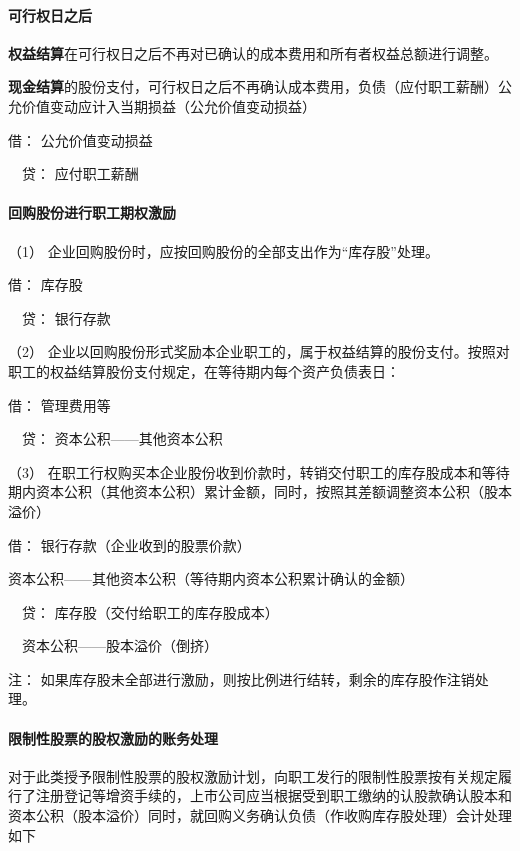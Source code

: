 \documentclass[UTF8,12pt]{ctexart}
\newenvironment{Dr}{\noindent 借：}{\par}
\newenvironment{Cr}{\noindent \ \ 贷：}{\par}
\numberwithin{equation}{section} %
\numberwithin{figure}{section}
\numberwithin{table}{section}
\begin{document}
	\paragraph{可行权日之后}
	\textbf{权益结算}在可行权日之后不再对已确认的成本费用和所有者权益总额进行调整。
	
	\textbf{现金结算}的股份支付，可行权日之后不再确认成本费用，负债（应付职工薪酬）公允价值变动应计入当期损益（公允价值变动损益）

	\begin{Dr}
		公允价值变动损益
	\end{Dr}	
	\begin{Cr}
		应付职工薪酬
	\end{Cr}

	
	\paragraph{回购股份进行职工期权激励}
	（1）	企业回购股份时，应按回购股份的全部支出作为“库存股”处理。
	
	\begin{Dr}
		库存股
	\end{Dr}
	\begin{Cr}
		银行存款
	\end{Cr}

	（2）	企业以回购股份形式奖励本企业职工的，属于权益结算的股份支付。按照对职工的权益结算股份支付规定，在等待期内每个资产负债表日：
	
	\begin{Dr}
		管理费用等
	\end{Dr}
	\begin{Cr}
		资本公积——其他资本公积
	\end{Cr}

	（3）	在职工行权购买本企业股份收到价款时，转销交付职工的库存股成本和等待期内资本公积（其他资本公积）累计金额，同时，按照其差额调整资本公积（股本溢价）
	
	\begin{Dr}
		银行存款（企业收到的股票价款）
		
		资本公积——其他资本公积（等待期内资本公积累计确认的金额）
	\end{Dr}
	\begin{Cr}
		库存股（交付给职工的库存股成本） 
		
		\ \ 资本公积——股本溢价（倒挤）
	\end{Cr}

	注：
	如果库存股未全部进行激励，则按比例进行结转，剩余的库存股作注销处理。
	
	\paragraph{限制性股票的股权激励的账务处理}
	对于此类授予限制性股票的股权激励计划，向职工发行的限制性股票按有关规定履行了注册登记等增资手续的，上市公司应当根据受到职工缴纳的认股款确认股本和资本公积（股本溢价）同时，就回购义务确认负债（作收购库存股处理）会计处理如下
	
\end{document}
